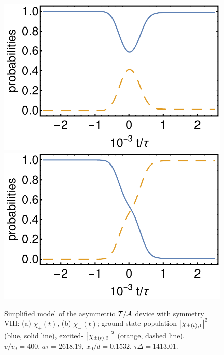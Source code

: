 \begin{figure}
	\begin{center}
		\includegraphics[width=0.48\linewidth]{Figures/asym_fig_t_a_approx_left.pdf}
		\includegraphics[width=0.48\linewidth]{Figures/asym_fig_t_a_approx_right.pdf}
	\end{center}
	\caption{Simplified model of the asymmetric ${\cal T/A}$ device with symmetry VIII: (a) $\chi_+(t)$, (b) $\chi_-(t)$; ground-state population $\left| \chi_{\pm(t),1} \right|^2$ (blue, solid line), excited-
	$\left| \chi_{\pm(t),2} \right|^2$ (orange, dashed line). $v/v_d = 400$, $a\tau = 2618.19$,
	$x_0/d = 0.1532$, $\tau\Delta = 1413.01$.
	\label{fig_t_a_approx}}
\end{figure}

